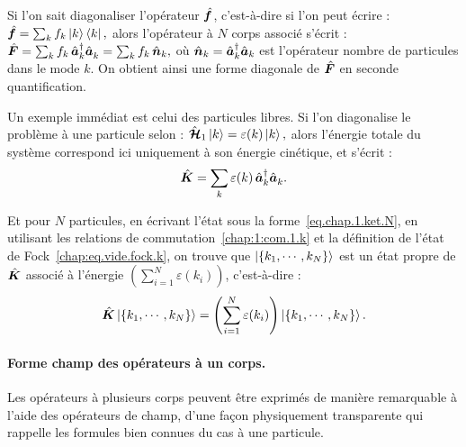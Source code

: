 Si l’on sait diagonaliser l’opérateur \( \hat{\bm{f}} \), c’est-à-dire si l’on peut écrire :
\(
	\hat{\bm{f}} = \sum_k f_k \ket{k} \bra{k},
\)
alors l’opérateur à $N$ corps associé s’écrit :
\(
	\hat{\bm{F}} = \sum_k f_k \, \hat{\bm{a}}^\dagger_k \hat{\bm{a}}_k^{} = \sum_k f_k \, \hat{\bm{n}}_k,
\)
où \( \hat{\bm{n}}_k = \hat{\bm{a}}^\dagger_k \hat{\bm{a}}_k \) est l’opérateur nombre de particules dans le mode \( k \). On obtient ainsi une forme diagonale de \( \hat{\bm{F}} \) en seconde quantification.
\begin{mdframed}[linewidth=0.5pt, backgroundcolor=gray!5, roundcorner=5pt]
Un exemple immédiat est celui des particules libres. Si l’on diagonalise le problème à une particule selon :
\(
	\hat{\bm{\mathcal{H}}}_1 \ket{k} = \varepsilon(k) \ket{k},
\)
alors l’énergie totale du système correspond ici uniquement à son énergie cinétique, et s’écrit :
\begin{equation}
	\hat{\bm{K}} = \sum_{k} \varepsilon(k) \, \hat{\bm{a}}^\dagger_k \hat{\bm{a}}_k^{}.\label{eq.chap.1.cinietique.1}
\end{equation}

Et pour $N$ particules, en écrivant l’état sous la forme~\eqref{eq.chap.1.ket.N}, en utilisant les relations de commutation~\eqref{chap:1:com.1.k} et la définition de l’état de Fock~\eqref{chap:eq.vide.fock.k}, on trouve que $\ket{\{k_1, \cdots, k_N\}}$ est un état propre de $\hat{\bm{K}}$ associé à l'énergie $\left( \sum_{i = 1}^N \varepsilon(k_i) \right)$, c’est-à-dire :
\begin{eqnarray}
	\hat{\bm{K}} \ket{\{k_1, \cdots, k_N\}} = \left( \sum_{i = 1}^N \varepsilon(k_i) \right) \ket{\{k_1, \cdots, k_N\}}.\label{eq.chap.1.cinietique.2}
\end{eqnarray}
\end{mdframed}

\paragraph{Forme champ des opérateurs à un corps.}

Les opérateurs à plusieurs corps peuvent être exprimés de manière remarquable à l’aide des opérateurs de champ, d’une façon physiquement transparente qui rappelle les formules bien connues du cas à une particule.

